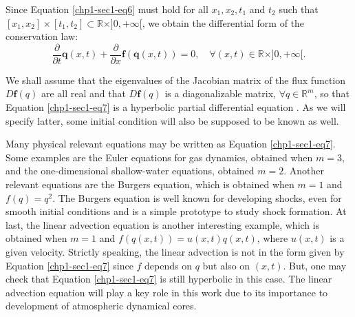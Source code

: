 Since Equation \eqref{chp1-sec1-eq6} must hold for all $x_1, x_2, t_1$ and $t_2$ such that
$[x_1, x_2] \times [t_1, t_2] \subset \mathbb{R}\times ]0, +\infty[$, we obtain the differential form of the conservation law:
\begin{equation}
	\label{chp1-sec1-eq7}
	\frac{\partial}{\partial t}\mathbf{q}(x, t) +
	\frac{\partial}{\partial x} \mathbf{f}(\mathbf{q}(x, t))
	= 0, \quad \forall (x,t) \in \mathbb{R}\times ]0, +\infty[. 
\end{equation}

We shall assume that the eigenvalues of the Jacobian matrix of the flux function
$D\mathbf{f}(q)$ are all real and that $D\mathbf{f}(q)$ is a diagonalizable matrix,
$\forall q \in \mathbb{R}^m$, so that Equation \eqref{chp1-sec1-eq7}
is a hyperbolic partial differential equation \citep{leveque:1990}. As we will 
specify latter, some initial condition will also be supposed to be known as well.

Many physical relevant equations may be written as Equation \eqref{chp1-sec1-eq7}.
Some examples are the Euler equations for gas dynamics, obtained when $m = 3$,
and the one-dimensional shallow-water equations, obtained $m = 2$.
Another relevant equations are the Burgers equation, which is obtained when
$m = 1$ and $f(q) = q^2$. The Burgers equation is well known for developing shocks,
even for smooth initial conditions and is a simple prototype to study shock formation.
At last, the linear advection equation is another interesting example, which is obtained
when $m = 1$ and $f(q(x,t)) = u(x,t)q(x,t)$, where $u(x,t)$ is a given velocity.
Strictly speaking, the linear advection is not in the form given by Equation
\eqref{chp1-sec1-eq7} since $f$ depends on $q$ but also on $(x,t)$.
But, one may check that Equation \eqref{chp1-sec1-eq7} is still hyperbolic
in this case. The linear advection equation will play a key role in this work due to its importance
to development of atmospheric dynamical cores.


